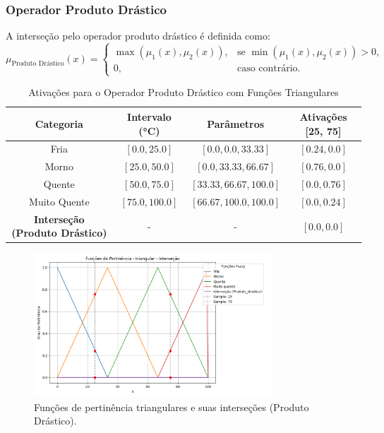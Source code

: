 \documentclass[a4paper,12pt]{article}
\begin{document}
\subsubsection{Operador Produto Drástico}

A interseção pelo operador produto drástico é definida como:
\[
\mu_{\text{Produto Drástico}}(x) =
\begin{cases}
\max(\mu_1(x), \mu_2(x)), & \text{se } \min(\mu_1(x), \mu_2(x)) > 0, \\
0, & \text{caso contrário.}
\end{cases}
\]

\begin{table}[H]
\centering
\caption{Ativações para o Operador Produto Drástico com Funções Triangulares}
\begin{tabular}{|c|c|c|c|}
\hline
\textbf{Categoria}    & \textbf{Intervalo (°C)} & \textbf{Parâmetros}       & \textbf{Ativações [25, 75]} \\ \hline
Fria                  & $[0.0, 25.0]$          & $[0.0, 0.0, 33.33]$       & $[0.24, 0.0]$              \\ \hline
Morno                 & $[25.0, 50.0]$         & $[0.0, 33.33, 66.67]$     & $[0.76, 0.0]$              \\ \hline
Quente                & $[50.0, 75.0]$         & $[33.33, 66.67, 100.0]$   & $[0.0, 0.76]$              \\ \hline
Muito Quente          & $[75.0, 100.0]$        & $[66.67, 100.0, 100.0]$   & $[0.0, 0.24]$              \\ \hline
\textbf{Interseção (Produto Drástico)} & -     & -                         & $[0.0, 0.0]$              \\ \hline
\end{tabular}
\end{table}

\begin{figure}[H]
    \centering
    \includegraphics[width=0.8\textwidth]{img/funções_de_pertinência_triangular_interseção_fuzzificado.png}
    \caption{Funções de pertinência triangulares e suas interseções (Produto Drástico).}
    \label{fig:intersecao_produto_drastico_triangular}
\end{figure}
\end{document}
